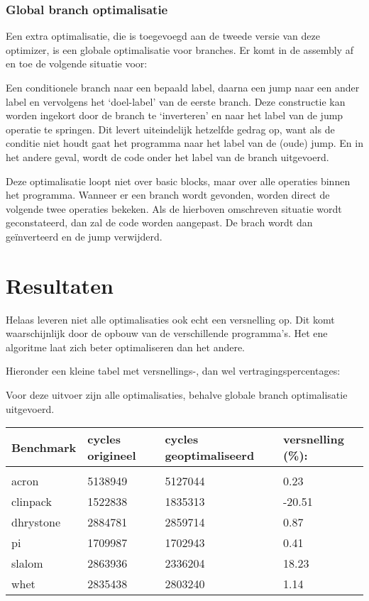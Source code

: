 \documentclass[11pt, a4paper]{uva_report}
\begin{document}
            \subsubsection{Global branch optimalisatie}
                Een extra optimalisatie, die is toegevoegd aan de tweede versie
                van deze optimizer, is een globale optimalisatie voor branches.
                Er komt in de assembly af en toe de volgende situatie voor:

                Een conditionele branch naar een bepaald label, daarna een jump
                naar een ander label en vervolgens het `doel-label' van de
                eerste branch. Deze constructie kan worden ingekort door de
                branch te `inverteren' en naar het label van de jump operatie te
                springen.  Dit levert uiteindelijk hetzelfde gedrag op, want als
                de conditie niet houdt gaat het programma naar het label van de
                (oude) jump. En in het andere geval, wordt de code onder het
                label van de branch uitgevoerd.

                Deze optimalisatie loopt niet over basic blocks, maar over alle
                operaties binnen het programma. Wanneer er een branch wordt
                gevonden, worden direct de volgende twee operaties bekeken. Als
                de hierboven omschreven situatie wordt geconstateerd, dan zal de
                code worden aangepast. De brach wordt dan ge\"inverteerd en de
                jump verwijderd.

       
        \section{Resultaten}
            Helaas leveren niet alle optimalisaties ook echt een versnelling op.
            Dit komt waarschijnlijk door de opbouw van de verschillende
            programma's. Het ene algoritme laat zich beter optimaliseren dan het
            andere.

            Hieronder een kleine tabel met versnellings-, dan wel
            vertragingspercentages:
            
            Voor deze uitvoer zijn alle optimalisaties, behalve globale branch
            optimalisatie uitgevoerd.\\
            
            \begin{tabular}{l | l | l | l}
                Benchmark & cycles origineel & cycles geoptimaliseerd &
                versnelling (\%):\\
                \hline\\
                acron & 5138949 & 5127044 & 0.23 \\
                clinpack & 1522838 & 1835313 & -20.51 \\
                dhrystone & 2884781 & 2859714 & 0.87 \\
                pi & 1709987 & 1702943 & 0.41 \\
                slalom & 2863936 & 2336204 & 18.23 \\
                whet & 2835438 & 2803240 & 1.14
            \end{tabular}
            
\end{document}

